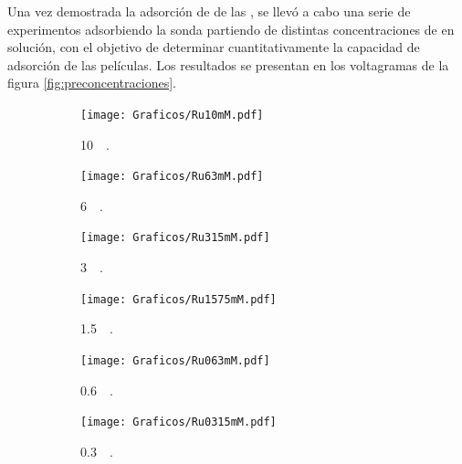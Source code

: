		Una vez demostrada la adsorción de \ru\space de las \pdm, se llevó a cabo una serie de experimentos adsorbiendo la sonda partiendo de distintas concentraciones de \ru\space en solución, con el objetivo de determinar cuantitativamente la capacidad de adsorción de las películas. Los resultados se presentan en los voltagramas de la figura \ref{fig:preconcentraciones}.
			\begin{figure}[b!]
			   	    \begin{subfigure}[t]{0.325\textwidth}
			        	\texttt{[image: Graficos/Ru10mM.pdf]}
			        	\vspace*{-0.40cm}\caption{\aminorutenio\space \SI{10}{\milli\Molar}.}
			         	\label{fig:Ru10mM}
			     		\end{subfigure}
			   	    \begin{subfigure}[t]{0.325\textwidth}
			        	\texttt{[image: Graficos/Ru63mM.pdf]}
			       		\vspace*{-0.40cm}\caption{\aminorutenio\space \SI{6}{\milli\Molar}.}
			         	\label{fig:Ru63mM}
			     		\end{subfigure}
		     		\begin{subfigure}[t]{0.325\textwidth}
			        	\texttt{[image: Graficos/Ru315mM.pdf]}
			       		\vspace*{-0.40cm}\caption{\aminorutenio\space \SI{3}{\milli\Molar}.}
			         	\label{fig:Ru315mM}
			     		\end{subfigure}
		     		\begin{subfigure}[t]{0.325\textwidth}
			        	\texttt{[image: Graficos/Ru1575mM.pdf]}
			       		\vspace*{-0.40cm}\caption{\aminorutenio\space \SI{1.5}{\milli\Molar}.}
			         	\label{fig:Ru1575M}
			     		\end{subfigure}
		 	   	   	\begin{subfigure}[t]{0.325\textwidth}
			        	\texttt{[image: Graficos/Ru063mM.pdf]}
			       		\vspace*{-0.40cm}\caption{\aminorutenio\space \SI{0.6}{\milli\Molar}.}
			         	\label{fig:Ru063mM}
			     		\end{subfigure}
		     		\begin{subfigure}[t]{0.325\textwidth}
			        	\texttt{[image: Graficos/Ru0315mM.pdf]}
			       		\vspace*{-0.40cm}\caption{\aminorutenio\space \SI{0.3}{\milli\Molar}.}
			         	\label{fig:Ru0315mM}
			     		\end{subfigure}
			     	 \begin{subfigure}[t]{0.325\textwidth}

\end{subfigure}
\end{figure}
